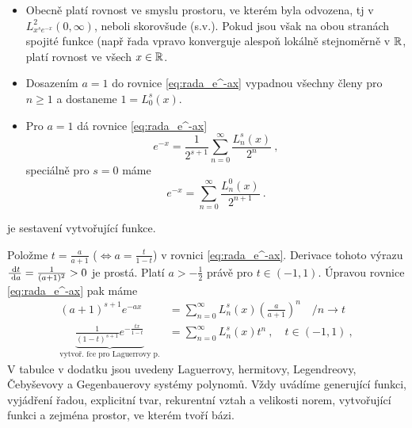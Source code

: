 \begin{remark}
\begin{itemize}
    \item Obecně platí rovnost ve smyslu prostoru, ve kterém byla odvozena, tj v $L^2_{x^se^{-x}}(0,\infty)$, neboli skorovšude (s.v.). Pokud jsou však na obou stranách spojité funkce (např řada vpravo konverguje alespoň lokálně stejnoměrně v $\mathbb{R}$, platí rovnost ve všech $x\in\mathbb{R}$.
    \item Dosazením $a=1$ do rovnice \ref{eq:rada_e^-ax} vypadnou všechny členy pro $n\geq1$ a dostaneme $1=L_0^s(x)$.
    \item Pro $a=1$ dá rovnice \ref{eq:rada_e^-ax}
    $$e^{-x}=\frac{1}{2^{s+1}}\sum\limits_{n=0}^\infty\frac{L_n^s(x)}{2^n}\:,$$
    speciálně pro $s=0$ máme 
    $$e^{-x}=\sum\limits_{n=0}^\infty \frac{L_n^0(x)}{2^{n+1}}\:.$$
\end{itemize}
\end{remark}



 je sestavení vytvořující funkce.

Položme $t=\frac{a}{a+1}$ ($\Leftrightarrow a=\frac{t}{1-t}$) v rovnici \ref{eq:rada_e^-ax}. Derivace tohoto výrazu $\frac{\;\mathrm{d}t}{\;\mathrm{d}a}=\frac{1}{(a+1)^2}>0$ je prostá. Platí $a>-\frac{1}{2}$ právě pro $t\in(-1,1)$. Úpravou rovnice \ref{eq:rada_e^-ax} pak máme 
\begin{align}
(a+1)^{s+1}e^{-ax}&=\sum\limits_{n=0}^\infty L_n^s(x)\left(\frac{a}{a+1}\right)^n \quad \Big/n\rightarrow t \\
\underbrace{\frac{1}{(1-t)^{s+1}}e^{-\frac{tx}{1-t}}}_{\text{vytvoř. fce pro Laguerrovy p.}}&=\sum\limits_{n=0}^\infty L_n^s(x) t^n\:,\quad t\in(-1,1)\:,
\end{align}
V tabulce  v dodatku jsou uvedeny Laguerrovy, hermitovy, Legendreovy, Čebyševovy a Gegenbauerovy systémy polynomů. Vždy uvádíme generující funkci, vyjádření řadou, explicitní tvar, rekurentní vztah a velikosti norem, vytvořující funkci a zejména prostor, ve kterém tvoří bázi.



